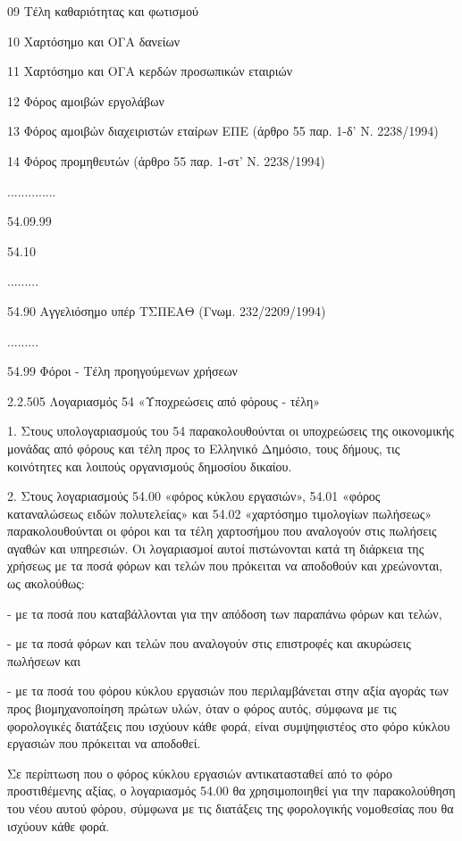 \documentclass[A4,10pt,greek]{book}
\begin{document}
                                09   Τέλη καθαριότητας και φωτισμού

                                10   Χαρτόσημο και ΟΓΑ δανείων

                                11   Χαρτόσημο και ΟΓΑ κερδών προσωπικών εταιριών

                                12   Φόρος αμοιβών εργολάβων

                                13   Φόρος αμοιβών διαχειριστών εταίρων ΕΠΕ (άρθρο 55 παρ. 1-δ'
                                        Ν. 2238/1994)

                                14   Φόρος προμηθευτών (άρθρο 55 παρ. 1-στ' Ν. 2238/1994)

                      ..............

                      54.09.99

        54.10

        .........

        54.90   Αγγελιόσημο υπέρ ΤΣΠΕΑΘ (Γνωμ. 232/2209/1994)

        .........

        54.99   Φόροι - Τέλη προηγούμενων χρήσεων

2.2.505 Λογαριασμός 54 «Υποχρεώσεις από φόρους - τέλη»

1. Στους υπολογαριασμούς του 54 παρακολουθούνται οι υποχρεώσεις της οικονομικής μονάδας από φόρους και τέλη προς το Ελληνικό Δημόσιο, τους δήμους, τις κοινότητες και λοιπούς οργανισμούς δημοσίου δικαίου.

2. Στους λογαριασμούς 54.00 «φόρος κύκλου εργασιών», 54.01 «φόρος καταναλώσεως ειδών πολυτελείας» και 54.02 «χαρτόσημο τιμολογίων πωλήσεως» παρακολουθούνται οι φόροι και τα τέλη χαρτοσήμου που αναλογούν στις πωλήσεις αγαθών και υπηρεσιών. Οι λογαριασμοί αυτοί πιστώνονται κατά τη διάρκεια της χρήσεως με τα ποσά φόρων και τελών που πρόκειται να αποδοθούν και χρεώνονται, ως ακολούθως:

- με τα ποσά που καταβάλλονται για την απόδοση των παραπάνω φόρων και τελών,

- με τα ποσά φόρων και τελών που αναλογούν στις επιστροφές και ακυρώσεις πωλήσεων και

- με τα ποσά του φόρου κύκλου εργασιών που περιλαμβάνεται στην αξία αγοράς των προς βιομηχανοποίηση πρώτων υλών, όταν ο φόρος αυτός, σύμφωνα με τις φορολογικές διατάξεις που ισχύουν κάθε φορά, είναι συμψηφιστέος στο φόρο κύκλου εργασιών που πρόκειται να αποδοθεί.

Σε περίπτωση που ο φόρος κύκλου εργασιών αντικατασταθεί από το φόρο προστιθέμενης αξίας, ο λογαριασμός 54.00 θα χρησιμοποιηθεί για την παρακολούθηση του νέου αυτού φόρου, σύμφωνα με τις διατάξεις της φορολογικής νομοθεσίας που θα ισχύουν κάθε φορά.
\end{document}
